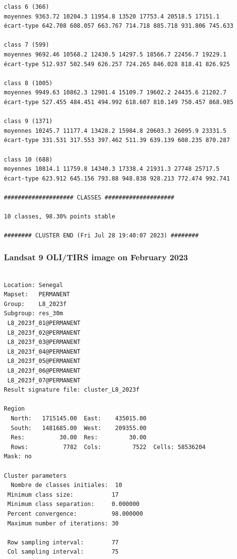 \documentclass[earth,article,submit,pdftex,moreauthors]{Definitions/mdpi}
\begin{document}
{\begin{scriptsize}
\begin{verbatim}
class 6 (366)
moyennes 9363.72 10204.3 11954.8 13520 17753.4 20518.5 17151.1
écart-type 642.708 608.057 663.767 714.718 885.718 931.806 745.633

class 7 (599)
moyennes 9692.46 10568.2 12430.5 14297.5 18566.7 22456.7 19229.1
écart-type 512.937 502.549 626.257 724.265 846.028 818.41 826.925

class 8 (1005)
moyennes 9949.63 10862.3 12901.4 15109.7 19602.2 24435.6 21202.7
écart-type 527.455 484.451 494.992 618.607 810.149 750.457 868.985

class 9 (1371)
moyennes 10245.7 11177.4 13428.2 15984.8 20603.3 26095.9 23331.5
écart-type 331.531 317.553 397.462 511.39 639.139 608.235 870.287

class 10 (688)
moyennes 10814.1 11759.8 14340.3 17338.4 21931.3 27748 25717.5
écart-type 623.912 645.156 793.88 948.838 928.213 772.474 992.741

#################### CLASSES ####################

10 classes, 98.30% points stable

######## CLUSTER END (Fri Jul 28 19:40:07 2023) ########

\end{verbatim}
\end{scriptsize}

\subsubsection[\appendixname~\thesubsubsection]{Landsat 9 OLI/TIRS image on February 2023}
\begin{scriptsize}
\begin{verbatim}

Location: Senegal
Mapset:   PERMANENT
Group:    L8_2023f
Subgroup: res_30m
 L8_2023f_01@PERMANENT
 L8_2023f_02@PERMANENT
 L8_2023f_03@PERMANENT
 L8_2023f_04@PERMANENT
 L8_2023f_05@PERMANENT
 L8_2023f_06@PERMANENT
 L8_2023f_07@PERMANENT
Result signature file: cluster_L8_2023f

Region
  North:   1715145.00  East:    435015.00
  South:   1481685.00  West:    209355.00
  Res:          30.00  Res:         30.00
  Rows:          7782  Cols:         7522  Cells: 58536204
Mask: no

Cluster parameters
  Nombre de classes initiales: 	10
 Minimum class size:           17
 Minimum class separation:     0.000000
 Percent convergence:          98.000000
 Maximum number of iterations: 30

 Row sampling interval:        77
 Col sampling interval:        75


\end{verbatim}
\end{scriptsize}}
\end{document}
